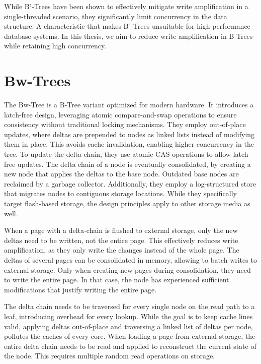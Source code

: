 While B$^\epsilon$-Trees have been shown to effectively mitigate write amplification in a single-threaded scenario, they significantly limit concurrency in the data structure.
A characteristic that makes B$^\epsilon$-Trees unsuitable for high-performance database systems.
In this thesis, we aim to reduce write amplification in B-Trees while retaining high concurrency.


\section{Bw-Trees}
The Bw-Tree \cite{levandoski2013bw} is a B-Tree variant optimized for modern hardware.
It introduces a latch-free design, leveraging atomic compare-and-swap operations to ensure consistency without traditional locking mechanisms.
They employ out-of-place updates, where deltas are prepended to nodes as linked lists instead of modifying them in place.
This avoids cache invalidation, enabling higher concurrency in the tree.
To update the delta chain, they use atomic \ac{CAS} operations to allow latch-free updates.
The delta chain of a node is eventually consolidated, by creating a new node that applies the deltas to the base node.
Outdated base nodes are reclaimed by a garbage collector.
Additionally, they employ a log-structured store that migrates nodes to contiguous storage locations.
While they specifically target flash-based storage, the design principles apply to other storage media as well.

When a page with a delta-chain is flushed to external storage, only the new deltas need to be written, not the entire page.
This effectively reduces write amplification, as they only write the changes instead of the whole page.
The deltas of several pages can be consolidated in memory, allowing to batch writes to external storage.
Only when creating new pages during consolidation, they need to write the entire page.
In that case, the node has experienced sufficient modifications that justify writing the entire page.

The delta chain needs to be traversed for every single node on the read path to a leaf, introducing overhead for every lookup.
While the goal is to keep cache lines valid, applying deltas out-of-place and traversing a linked list of deltas per node, pollutes the caches of every core.
When loading a page from external storage, the entire delta chain needs to be read and applied to reconstruct the current state of the node.
This requires multiple random read operations on storage.

